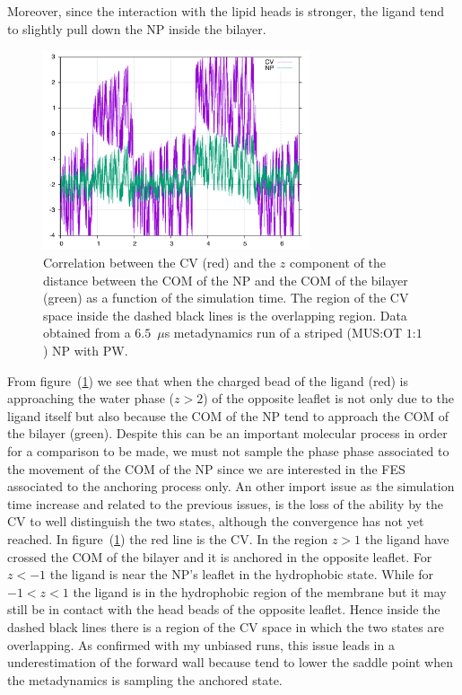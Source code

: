 Moreover, since the interaction with the lipid heads is stronger, the ligand tend to slightly pull down the \ac{NP} inside the bilayer.
\begin{figure}[!ht]
	\centering
	\includegraphics[width=0.7\textwidth]{./img/results/NPDistance/NPDist}
	\caption{Correlation between the \acs{CV} (red) and the $z$ component of the distance between the \acs{COM} of the \acs{NP} and the \acs{COM} of the bilayer (green) as a function of the simulation time. The region of the \acs{CV} space inside the dashed black lines is the overlapping region. Data obtained from a $6.5$~$\mu$s metadynamics run of a striped (\acs{MUS}:\acs{OT} $1$:$1$) \acs{NP} with \acs{PW}.}
	\label{fig:NPDist}
\end{figure}
From figure~(\ref{fig:NPDist}) we see that when the charged bead of the ligand (red) is approaching the water phase ($z>2$) of the opposite leaflet is not only due to the ligand itself but also because the \ac{COM} of the \ac{NP} tend to approach the \ac{COM} of the bilayer (green). Despite this can be an important molecular process in order for a comparison to be made, we must not sample the phase phase associated to the movement of the \ac{COM} of the \ac{NP} since we are interested in the \ac{FES} associated to the anchoring process only. An other import issue as the simulation time increase and related to the previous issues, is the loss of the ability by the \ac{CV} to well distinguish the two states, although the convergence has not yet reached. In figure~(\ref{fig:NPDist}) the red line is the \ac{CV}. In the region $z > 1$ the ligand have crossed the \ac{COM} of the bilayer and it is anchored in the opposite leaflet. For $z < -1$ the ligand is near the \ac{NP}'s leaflet in the hydrophobic state. While for $-1 < z < 1$ the ligand is in the hydrophobic region of the membrane but it may still be in contact with the head beads of the opposite leaflet. Hence inside the dashed black lines there is a region of the \ac{CV} space in which the two states are overlapping. As confirmed with my unbiased runs, this issue leads in a underestimation of the forward wall because tend to lower the saddle point when the metadynamics is sampling the anchored state.

